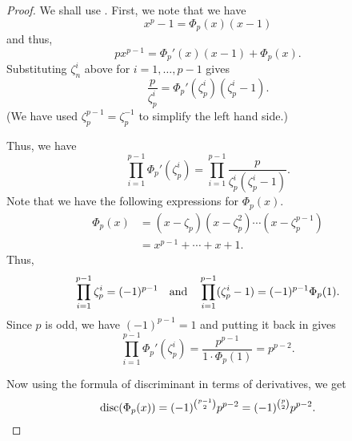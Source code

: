 \cyclodisc*\label{lem:cyclodisc2}
\begin{flushright}\hyperref[lem:cyclodisc]{\upsym}\end{flushright}
\begin{proof}
    We shall use . First, we note that we have
    \begin{equation*} 
        x^p - 1 = \Phi_p(x)(x - 1)
    \end{equation*}
    and thus,
    \begin{equation*} 
        px^{p - 1} = \Phi_p'(x)(x - 1) + \Phi_p(x).
    \end{equation*}
    Substituting $\zeta_n^i$ above for $i = 1, \ldots, p - 1$ gives
    \begin{equation*} 
        \frac{p}{\zeta_p^i} = \Phi_p'(\zeta_p^i)(\zeta_p^i - 1).
    \end{equation*}
    (We have used $\zeta_p^{p - 1} = \zeta_p^{-1}$ to simplify the left hand side.)

    Thus, we have
    \begin{equation} \label{eq:004} \tag{$\prod$}
        \prod_{i = 1}^{p - 1} \Phi_p'(\zeta_p^i) = \prod_{i = 1}^{p - 1} \frac{p}{\zeta_p^i(\zeta_p^i - 1)}.
    \end{equation}
    Note that we have the following expressions for $\Phi_p(x).$
    \begin{align*} 
        \Phi_p(x) &= (x - \zeta_p)(x - \zeta_p^2) \cdots (x - \zeta_p^{p - 1})\\
        &= x^{p - 1} + \cdots + x + 1.
    \end{align*}
    Thus,
    \begin{equation*} 
        \prod_{i = 1}^{p - 1} \zeta_p^i = (-1)^{p - 1}\quad\text{and}\quad \prod_{i = 1}^{p - 1}(\zeta_p^i - 1) = (-1)^{p - 1}\Phi_p(1).
    \end{equation*}
    Since $p$ is odd, we have $(-1)^{p - 1} = 1$ and putting it back in  gives
    \begin{equation*} 
        \prod_{i = 1}^{p - 1} \Phi_p'(\zeta_p^i) = \frac{p^{p - 1}}{1 \cdot \Phi_p(1)} = p^{p - 2}.
    \end{equation*}

    Now using the formula of discriminant in terms of derivatives, we get
    \begin{equation*} 
        \operatorname{disc}(\Phi_p(x)) = (-1)^{\binom{p - 1}{2}}p^{p - 2} = (-1)^{\binom{p}{2}}p^{p - 2}. \qedhere
    \end{equation*}
\end{proof}

